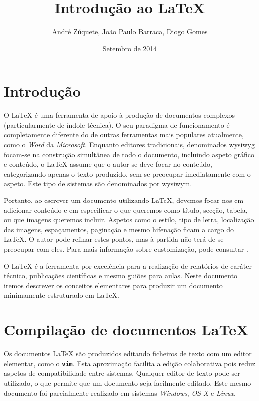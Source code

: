 \documentclass[11pt,a4paper,article]{memoir}
\title{Introdução ao \LaTeX}
\author{André Zúquete, João Paulo Barraca, Diogo Gomes}
\date{Setembro de 2014}
\newcommand{\foreign}[2][nohyphenation]{\protect\foreignlanguage{#1}{\slshape{#2}}}
\newcommand{\english}[1]{\foreign[english]{#1}}
\newcommand{\code}[1]{\texttt{\textbf{#1}}}
\def\linux{\english{Linux}}
\begin{document}
\maketitle

\newpage
\tableofcontents*
\newpage
\listoffigures*
\newpage

\chapter{Introdução}

O {\LaTeX} é uma ferramenta de apoio à produção de documentos
complexos (particularmente de índole técnica). O seu paradigma de funcionamento é completamente
diferente do de outras ferramentas mais populares atualmente, como o
\english{Word} da \english{Microsoft}. Enquanto editores tradicionais, 
denominados \ac{wysiwyg} focam-se na construção simultânea de todo
o documento, incluindo aspeto gráfico e conteúdo, o {\LaTeX} assume que
o autor se deve focar no conteúdo, categorizando apenas o texto produzido,
sem se preocupar imediatamente com o aspeto. Este tipo de sistemas são
denominados por \ac{wysiwym}.

Portanto, ao escrever um documento utilizando {\LaTeX}, devemos focar-nos
em adicionar conteúdo e em especificar o que queremos como título, secção,
tabela, ou que imagens queremos incluir. Aspetos como o estilo, tipo de letra,
localização das imagens, espaçamentos, paginação e mesmo hifenação
ficam a cargo do {\LaTeX}. O autor pode refinar estes pontos, mas à partida não terá
de se preocupar com eles. Para mais informação sobre customização, pode consultar
\cite{wikibooks-latex}\cite{tex-stackexchange}.

O {\LaTeX} é a ferramenta por excelência para a realização de relatórios
de caráter técnico, publicações científicas e mesmo guiões para
aulas. Neste documento iremos descrever os
conceitos elementares para produzir um documento minimamente estruturado em 
{\LaTeX}.


%
%
%
%
\chapter{Compilação de documentos {\LaTeX}}

Os documentos {\LaTeX} são produzidos editando ficheiros de texto
com um editor elementar, como o \code{vim}. Esta aproximação facilita
a edição colaborativa pois reduz aspetos de compatibilidade entre sistemas.
Qualquer editor de texto pode ser utilizado, o que permite que um documento seja
facilmente editado. Este mesmo documento foi parcialmente realizado em 
sistemas \english{Windows}, \english{OS X} e {\linux}.
\end{document}
